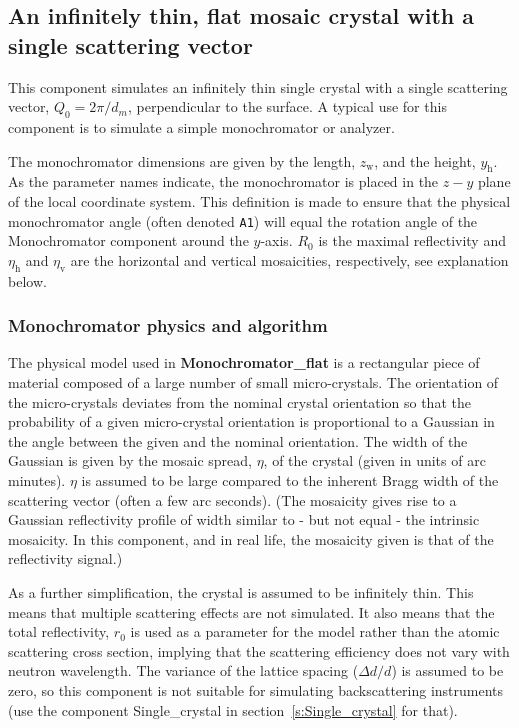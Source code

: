 \subsection*{An infinitely thin, flat mosaic crystal with
a single scattering vector}
\label{s:monochromator_flat}


This component simulates an infinitely thin single
crystal with a single scattering vector, $Q_0=2\pi / d_m$, perpendicular to the
surface. A typical
use for this component is to simulate a simple monochromator or analyzer.

The monochromator dimensions are given by the length, $z_\textrm{w}$, and
the height, $y_\textrm{h}$. As the parameter names indicate, the
monochromator is placed in the $z-y$ plane of the local coordinate system.
This definition is made to ensure that the physical monochromator angle
(often denoted \verb+A1+) will equal the \MCS rotation angle
of the Monochromator component around the $y$-axis.
$R_0$ is the maximal reflectivity and
$\eta_\textrm{h}$ and $\eta_\textrm{v}$ are the horizontal and vertical mosaicities,
respectively, see explanation below.

\subsubsection{Monochromator physics and algorithm}
The physical model used in \textbf{Monochromator\_flat} is a rectangular piece of
material composed of a large number of small micro-crystals.
The orientation of the
micro-crystals deviates from the nominal crystal orientation so that the
probability of a given micro-crystal orientation is proportional to a
Gaussian in the angle between the given and the nominal orientation. The
width of the Gaussian is given by the mosaic spread, $\eta$, of the crystal
(given in units of arc minutes).
$\eta$ is assumed to be large compared to the inherent Bragg width of the
scattering vector (often a few arc seconds).
(The mosaicity gives rise to a Gaussian reflectivity profile of width
similar to - but not equal - the intrinsic mosaicity.
In this component, and in real life, the mosaicity given is that of the
reflectivity signal.)

As a further simplification, the crystal is assumed to be infinitely
thin. This means that multiple scattering effects are not simulated. It
also means that the total reflectivity, $r_0$ is used as a parameter for
the model rather than the atomic scattering cross section, implying that
the scattering efficiency does not vary with neutron wavelength.
The variance
of the lattice spacing ($\Delta d/d$) is assumed to be zero, so this
component is not suitable for simulating backscattering instruments (use
the component \textrm{Single\_crystal}
in section~\ref{s:Single_crystal} for that).

